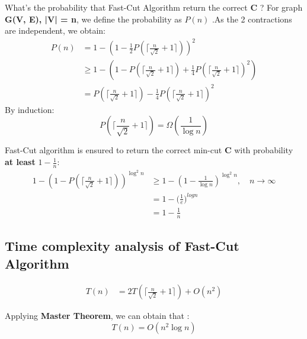 \documentclass[a4paper, 12pt, titlepage]{article}
\begin{document}
What's the probability that Fast-Cut Algorithm return the correct {\bf C} ?
For graph {\bf G(V, E), |V| = n}, we define the probability as {\bf $P(n)$ }.As the 2 contractions are independent, we obtain:
\begin{equation}
    \begin{aligned}
        P(n) &= 1 - (1 - \frac{1}{2} P(\lceil \frac{n}{\sqrt{2}} + 1 \rceil))^2 \\
             &\geq 1 - \left( 1 - P(\lceil \frac{n}{\sqrt{2}} + 1 \rceil) + \frac{1}{4} P(\lceil \frac{n}{\sqrt{2}} + 1 \rceil)^2 \right) \\
             &= P(\lceil \frac{n}{\sqrt{2}} + 1 \rceil) - \frac{1}{4} P(\lceil \frac{n}{\sqrt{2}} + 1 \rceil)^2
    \end{aligned}
\end{equation}
By induction:
 \[
    P(\lceil \frac{n}{\sqrt{2}} + 1 \rceil) = \Omega(\frac{1}{\log{n}})
 \]

Fast-Cut algorithm is ensured to return the correct min-cut {\bf C} with probability {\bf at least} $ 1 - \frac{1}{n}$:
\begin{equation}
    \begin{aligned}
        1 - (1 - P(\lceil \frac{n}{\sqrt{2}} + 1 \rceil))^{\log^2{n}} &\geq 1 - (1 - \frac{1}{\log{n}})^{\log^2{n}} , \quad n \rightarrow \infty \\
                                                                      &= 1 - \bigg( \frac{1}{e} \bigg)^{log{n}} \\
                                                                      &= 1 - \frac{1}{n}
    \end{aligned}
\end{equation}


\subsection{Time complexity analysis of Fast-Cut Algorithm}
\begin{equation}
    \begin{aligned}
        T(n) &= 2 T(\lceil \frac{n}{\sqrt{2}} + 1 \rceil) + O(n^2)
    \end{aligned}
\end{equation}

Applying {\bf Master Theorem}, we can obtain that : 
\[
    T(n) = O(n^2 \log{n})
\]
\end{document}
